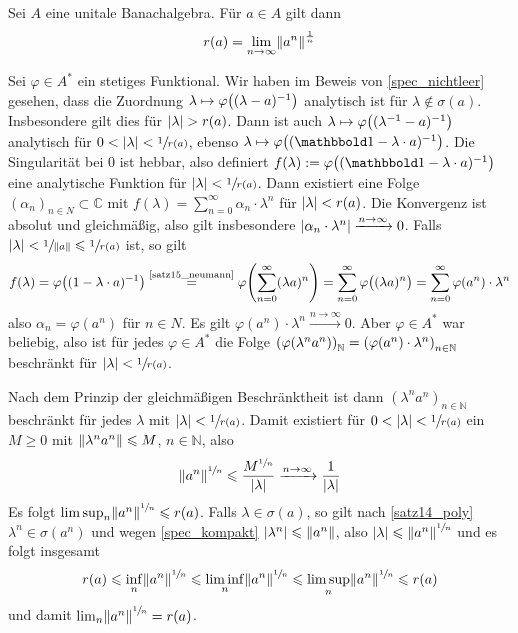 \begin{satz}[{name=[Formel für den Spektralradius]}]
	Sei $A$ eine unitale Banachalgebra. Für $a \in A$ gilt dann 
	\[
		r(a)=\lim_{n \to \infty}\norm{a^n}^{\frac{1}{n}}
	\]
\end{satz}
\begin{beweis}
	Sei $\varphi \in A^*$ ein stetiges Funktional. Wir haben im Beweis von \autoref{spec_nichtleer} gesehen, dass die Zuordnung 
	$\lambda \mapsto \varphi \enbrace*{(\lambda-a)^{-1}}$ analytisch ist für $\lambda \notin \sigma(a)$. Insbesondere gilt dies für $\abs{\lambda}> r(a)$. Dann ist auch
	$\lambda \mapsto \varphi \enbrace*{(\lambda^{-1}-a)^{-1}}$ analytisch für $0< \abs{\lambda}< \sfrac{1}{r(a)}$, ebenso 
	$\lambda \mapsto \varphi \enbrace*{(\ind- \lambda \cdot a)^{-1}}$. Die Singularität bei $0$ ist hebbar, also definiert $f(\lambda) := \varphi \enbrace*{(\ind-\lambda \cdot a)^{-1}}$
	eine analytische Funktion für $\abs{\lambda} < \sfrac{1}{r(a)}$. Dann existiert eine Folge $(\alpha_n)_{n \in N} \subset \mathbb{C}$ mit 
	$f(\lambda) = \sum_{n=0}^{\infty} \alpha_n \cdot \lambda^n$ für $\abs{\lambda}<r(a)$. Die Konvergenz ist absolut und gleichmäßig, also gilt insbesondere 
	$\abs{\alpha_n \cdot \lambda^n} \xrightarrow{n \to \infty}0$. Falls $\abs{\lambda} < \sfrac{1}{\norm{a}} \le \sfrac{1}{r(a)}$ 
	ist, so gilt
	\[
		f(\lambda) = \varphi \enbrace*{(1- \lambda \cdot a)^{-1}} \stackrel{\mbox{\scriptsize\ref{satz15_neumann}}}{=} \varphi \enbrace*{\sum_{n=0}^{\infty} (\lambda a)^n} = 
		\sum_{n=0}^{\infty} \varphi \enbrace[\big]{(\lambda a)^n} = \sum_{n=0}^{\infty} \varphi(a^n) \cdot \lambda^n
	\]
	also $\alpha_n = \varphi(a^n)$ für $n \in N$. Es gilt $\varphi(a^n) \cdot \lambda^n \xrightarrow{n \to \infty} 0$. Aber $\varphi \in A^*$ war beliebig, also ist für jedes 
	$\varphi \in A^*$ die Folge $\enbrace*{\varphi(\lambda^n a^n)}_\mathbb{N} = \enbrace*{\varphi(a^n) \cdot \lambda^n}_{n \in \mathbb{N}}$ beschränkt für 
	$\abs{\lambda}<\sfrac{1}{r(a)}$.

	Nach dem Prinzip der gleichmäßigen Beschränktheit ist dann $(\lambda^n a^n)_{n \in \mathbb{N}}$ beschränkt für jedes $\lambda$ mit $\abs{\lambda}< \sfrac{1}{r(a)}$. Damit 
	existiert für $0 < \abs{\lambda}< \sfrac{1}{r(a)}$ ein $M \ge 0$ mit $\norm{\lambda^n a^n} \le M$, $n \in \mathbb{N}$, also 
	\[
		\norm{a^n}^{\sfrac{1}{n}}\le\frac{M^{\sfrac{1}{n}}}{\abs{\lambda}} \xrightarrow{n \to \infty} \frac{1}{\abs{\lambda}} 
	\]
	Es folgt $\limsup_n \norm{a^n}^{\sfrac{1}{n}} \le r(a)$. Falls $\lambda \in \sigma(a)$, so gilt nach \autoref{satz14_poly} $\lambda^n \in \sigma(a^n)$ und wegen 
	\autoref{spec_kompakt} $\abs{\lambda^n} \le \norm{a^n}$, also $\abs{\lambda} \le \norm{a^n}^{\sfrac{1}{n}}$ und es folgt insgesamt
	\begin{align}
		r(a) \le \inf_n \norm{a^n}^{\sfrac{1}{n}} \le \liminf_n \norm{a^n}^{\sfrac{1}{n}} \le \limsup_n \norm{a^n}^{\sfrac{1}{n}} \le r(a)
	\end{align}
	und damit $\lim_n \norm{a^n}^{\sfrac{1}{n}} = r(a)$.
\end{beweis}

